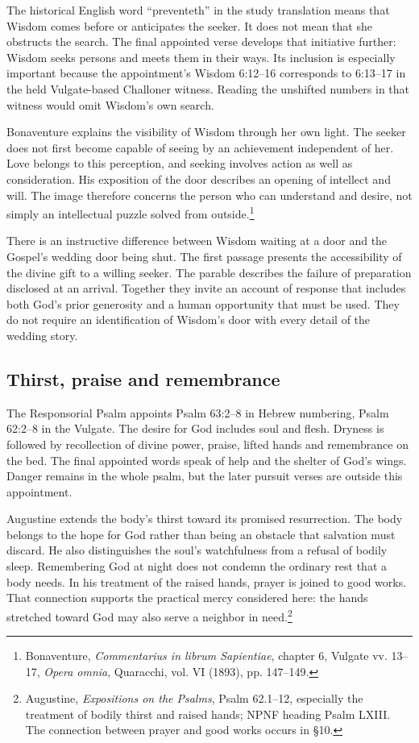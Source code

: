 The historical English word ``preventeth'' in the study translation means that Wisdom comes before or anticipates the seeker. It does not mean that she obstructs the search. The final appointed verse develops that initiative further: Wisdom seeks persons and meets them in their ways. Its inclusion is especially important because the appointment's Wisdom 6:12--16 corresponds to 6:13--17 in the held Vulgate-based Challoner witness. Reading the unshifted numbers in that witness would omit Wisdom's own search.

Bonaventure explains the visibility of Wisdom through her own light. The seeker does not first become capable of seeing by an achievement independent of her. Love belongs to this perception, and seeking involves action as well as consideration. His exposition of the door describes an opening of intellect and will. The image therefore concerns the person who can understand and desire, not simply an intellectual puzzle solved from outside.\footnote{Bonaventure, \textit{Commentarius in librum Sapientiae}, chapter 6, Vulgate vv. 13--17, \textit{Opera omnia}, Quaracchi, vol. VI (1893), pp. 147--149.}

There is an instructive difference between Wisdom waiting at a door and the Gospel's wedding door being shut. The first passage presents the accessibility of the divine gift to a willing seeker. The parable describes the failure of preparation disclosed at an arrival. Together they invite an account of response that includes both God's prior generosity and a human opportunity that must be used. They do not require an identification of Wisdom's door with every detail of the wedding story.

\subsection{Thirst, praise and remembrance}
The Responsorial Psalm appoints Psalm 63:2--8 in Hebrew numbering, Psalm 62:2--8 in the Vulgate. The desire for God includes soul and flesh. Dryness is followed by recollection of divine power, praise, lifted hands and remembrance on the bed. The final appointed words speak of help and the shelter of God's wings. Danger remains in the whole psalm, but the later pursuit verses are outside this appointment.

Augustine extends the body's thirst toward its promised resurrection. The body belongs to the hope for God rather than being an obstacle that salvation must discard. He also distinguishes the soul's watchfulness from a refusal of bodily sleep. Remembering God at night does not condemn the ordinary rest that a body needs. In his treatment of the raised hands, prayer is joined to good works. That connection supports the practical mercy considered here: the hands stretched toward God may also serve a neighbor in need.\footnote{Augustine, \textit{Expositions on the Psalms}, Psalm 62.1--12, especially the treatment of bodily thirst and raised hands; NPNF heading Psalm LXIII. The connection between prayer and good works occurs in §10.}

